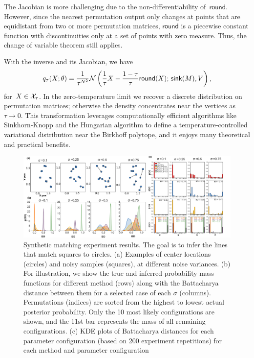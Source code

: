 \documentclass[twoside]{article}
\begin{document}

The Jacobian is more challenging due to the non-differentiability
of~$\mathsf{round}$. However, since the nearest permutation output
only changes at points that are equidistant from two or more
permutation matrices, $\mathsf{round}$ is a piecewise constant
function with discontinuities only at a set of points with
zero measure. Thus, the change of variable theorem still applies.

With the inverse and its Jacobian, we have
\begin{align*}
  q_\tau(X; \theta) = 
  \frac{1}{\tau^{N^2}} \mathcal{N} \left( \frac{1}{\tau}X -\frac{1-\tau}{\tau} \mathsf{round}(X); \, \mathsf{sink}(M), V \right),
\end{align*}
for~${X \in \mathcal{X}_\tau}$.
In the zero-temperature limit we recover a discrete
distribution on permutation matrices; otherwise the density
concentrates near the vertices as~${\tau \to 0}$.  This
transformation leverages computationally efficient algorithms
like Sinkhorn-Knopp and the Hungarian algorithm to define a
temperature-controlled variational distribution near the
Birkhoff polytope, and it enjoys many theoretical and practical
benefits.

\begin{figure}[ht] 
   \centering
   \includegraphics[width=6in]{../figures/figure8.pdf}
   \caption{Synthetic matching experiment results. The goal is to
     infer the lines that match squares to circles. (a) Examples of
     center locations (circles) and noisy samples (squares), at
     different noise variances. (b) For illustration, we show the true
     and inferred probability mass functions for different method (rows) along with the
     Battacharya distance between them for a selected case of each $\sigma$ (columns). Permutations (indices) are sorted from the highest to
     lowest actual posterior probability. Only the 10 most likely
     configurations are shown, and the 11st bar represents the mass of
     all remaining configurations. (c) KDE plots of Battacharya
     distances for each parameter configuration (based on 200 experiment repetitions) for each method and parameter configuration}
   \label{fig:synthetic}
\end{figure}
\end{document}
